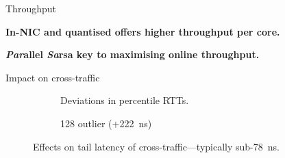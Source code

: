 \documentclass[aspectratio=169,xcolor={dvipsnames}
,handout
]{beamer}
\begin{document}
\begin{frame}{Throughput}
	\centering
	\pause
	
	\textbf{In-NIC and quantised offers \alert{higher throughput per core}.}\pause
	
	\textbf{\emph{Par}allel \emph{Sa}rsa key to maximising \alert{online} throughput.}
\end{frame}

\begin{frame}{Impact on cross-traffic}
	\centering
	\begin{figure}
		\centering
		\begin{subfigure}{0.45\linewidth}
			\caption{Deviations in  percentile RTTs.\label{fig:dataplane-heat}}
		\end{subfigure}
		\hspace{0.05\linewidth}
		\begin{subfigure}{0.45\linewidth}
			\caption{\SI{128}{\byte} outlier ($+$\SI{222}{\nano\second})}
		\end{subfigure}
		\caption{Effects on tail latency of cross-traffic---typically sub-\SI{78}{\nano\second}.\label{fig:dataplane-coop}}
	\end{figure}
\end{frame}
\end{document}
